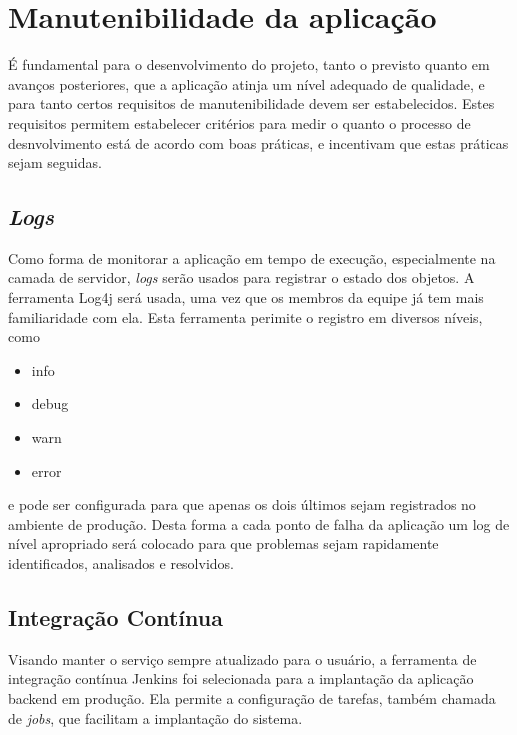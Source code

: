 \section{Manutenibilidade da aplicação}

É fundamental para o desenvolvimento do projeto, tanto o previsto
quanto em avanços posteriores, que a aplicação atinja um nível adequado
de qualidade, e para tanto certos requisitos de manutenibilidade devem
ser estabelecidos.  Estes requisitos permitem estabelecer critérios
para medir o quanto o processo de desnvolvimento está de acordo com
boas práticas, e incentivam que estas práticas sejam seguidas.

\subsection{\emph{Logs}}

Como forma de monitorar a aplicação em tempo de execução,
especialmente na camada de servidor, \emph{logs} serão usados para
registrar o estado dos objetos. A ferramenta Log4j será usada, uma vez
que os membros da equipe já tem mais familiaridade com ela. Esta
ferramenta perimite o registro em diversos níveis, como
\begin{itemize}
  \em
\item info
\item debug
\item warn
\item error
\end{itemize}
e pode ser configurada para que apenas os dois últimos
sejam registrados no ambiente de produção. Desta forma a cada ponto de
falha da aplicação um log de nível apropriado será colocado para que
problemas sejam rapidamente identificados, analisados e resolvidos.

\subsection{Integração Contínua}

Visando manter o serviço sempre atualizado para o usuário, a
ferramenta de integração contínua Jenkins foi selecionada para a
implantação da aplicação \gls{backend} em produção. Ela permite a
configuração de tarefas, também chamada de \emph{jobs}, que facilitam
a implantação do sistema.


